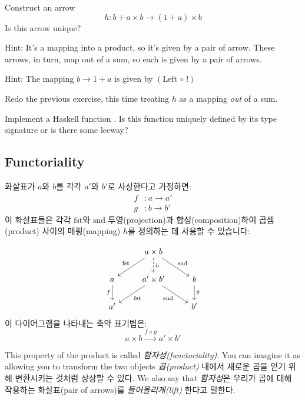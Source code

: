 \documentclass[DaoFP]{subfiles}
\begin{document}
\begin{exercise}
Construct an arrow 
\[ h \colon b + a \times b \to (1 + a) \times b \]
Is this arrow unique?

Hint: It's a mapping into a product, so it's given by a pair of arrow. These arrows, in turn, map out of a sum, so each is given by a pair of arrows. 

Hint: The mapping $b \to 1 + a$ is given by $(\text{Left} \, \circ \, !)$
\end{exercise}

\begin{exercise}
Redo the previous exercise, this time treating $h$ as a mapping \emph{out} of a sum. 
\end{exercise}

\begin{exercise}
Implement a Haskell function . Is this function uniquely defined by its type signature or is there some leeway?
\end{exercise}

\subsection{Functoriality}

화살표가 $a$와 $b$를 각각 $a'$와 $b'$로 사상한다고 가정하면:
\begin{align*}
f &\colon a \to a' \\
g &\colon b \to b'
\end{align*}
이 화살표들은 각각 $\text{fst}$와 $\text{snd}$ 투영(projection)과 합성(composition)하여 곱셈(product) 사이의 매핑(mapping) $h$를 정의하는 데 사용할 수 있습니다:

\[
 \begin{tikzcd}
 & a \times b
\arrow[d, dashed, "h"]
 \arrow[dl,  "\text{fst}"']
 \arrow[dr,   "\text{snd}"]
\\
a
\arrow[d, "f"']
&a' \times b'
 \arrow[dl,  "\text{fst}"]
  \arrow[dr,   "\text{snd}"']
& b
\arrow[d, "g"]
\\
a' && b'
 \end{tikzcd}
\]
이 다이어그램을 나타내는 축약 표기법은:
\[ a \times b \xrightarrow{f \times g} a' \times b' \]

This property of the product is called \emph{함자성(functoriality)}. You can imagine it as allowing you to transform the two objects \emph{곱(product)} 내에서 새로운 곱을 얻기 위해 변환시키는 것처럼 상상할 수 있다. We also say that \emph{함자성}은 우리가 곱에 대해 작용하는 화살표(pair of arrows)를 \emph{들어올리게(lift)} 한다고 말한다.
\end{document}
